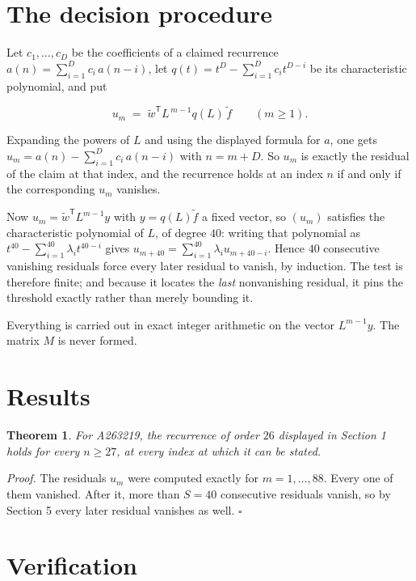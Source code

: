 \documentclass[11pt]{article}
\newtheorem{theorem}{Theorem}
\theoremstyle{definition}
\begin{document}
\section{The decision procedure}

Let $c_1,\dots,c_D$ be the coefficients of a claimed recurrence $a(n) = \sum_{i=1}^{D} c_i\,a(n-i)$, let $q(t) = t^{D} - \sum_{i=1}^{D} c_i t^{D-i}$ be its characteristic polynomial, and put

\[u_m \;=\; \tilde w^{\mathsf T} L^{\,m-1} q(L)\,\tilde f \qquad (m \ge 1).\]

Expanding the powers of $L$ and using the displayed formula for $a$, one gets $u_m = a(n) - \sum_{i=1}^{D} c_i\,a(n-i)$ with $n = m + D$. So $u_m$ is exactly the residual of the claim at that index, and the recurrence holds at an index $n$ if and only if the corresponding $u_m$ vanishes.

Now $u_m = \tilde w^{\mathsf T} L^{m-1} y$ with $y = q(L)\tilde f$ a fixed vector, so $(u_m)$ satisfies the characteristic polynomial of $L$, of degree $40$: writing that polynomial as $t^{40} - \sum_{i=1}^{40} \lambda_i t^{40-i}$ gives $u_{m+40} = \sum_{i=1}^{40} \lambda_i u_{m+40-i}$. Hence $40$ consecutive vanishing residuals force every later residual to vanish, by induction. The test is therefore finite; and because it locates the {\itshape last} nonvanishing residual, it pins the threshold exactly rather than merely bounding it.

Everything is carried out in exact integer arithmetic on the vector $L^{m-1}y$. The matrix $M$ is never formed.

\section{Results}

\begin{theorem} For A263219, the recurrence of order $26$ displayed in Section 1 holds for every $n \ge 27$, at every index at which it can be stated.\end{theorem}

{\itshape Proof.} The residuals $u_m$ were computed exactly for $m = 1,\dots,88$. Every one of them vanished. After it, more than $S = 40$ consecutive residuals vanish, so by Section 5 every later residual vanishes as well. $\square$

\section{Verification}
\end{document}
